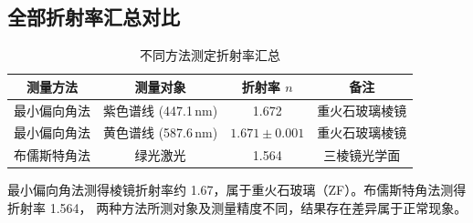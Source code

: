 \documentclass[12pt,a4paper]{ctexart}
\begin{document}
\subsection{全部折射率汇总对比}

\begin{table}[h]
\centering
\caption{不同方法测定折射率汇总}
\begin{tabular}{cccc}
\toprule
测量方法 & 测量对象 & 折射率 $n$ & 备注 \\
\midrule
最小偏向角法 & 紫色谱线 (447.1\,nm) & 1.672 & 重火石玻璃棱镜 \\
最小偏向角法 & 黄色谱线 (587.6\,nm) & $1.671 \pm 0.001$ & 重火石玻璃棱镜 \\
布儒斯特角法 & 绿光激光            & 1.564 & 三棱镜光学面 \\
\bottomrule
\end{tabular}
\end{table}

最小偏向角法测得棱镜折射率约 1.67，属于重火石玻璃（ZF）。布儒斯特角法测得折射率 1.564，
两种方法所测对象及测量精度不同，结果存在差异属于正常现象。
\end{document}
